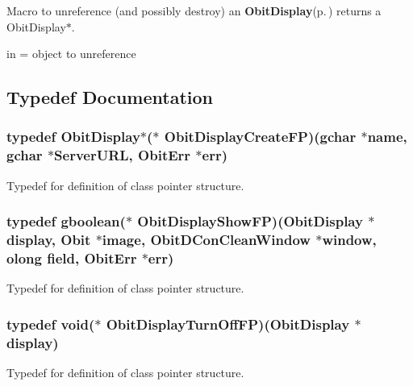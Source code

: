 Macro to unreference (and possibly destroy) an {\bf Obit\-Display}{\rm (p.\,\pageref{structObitDisplay})} returns a Obit\-Display$\ast$. 

in = object to unreference 

\subsection{Typedef Documentation}
\subsubsection{\setlength{\rightskip}{0pt plus 5cm}typedef {\bf Obit\-Display}$\ast$($\ast$ {\bf Obit\-Display\-Create\-FP})(gchar $\ast$name, gchar $\ast$Server\-URL, {\bf Obit\-Err} $\ast$err)}\label{ObitDisplay_8h_a3}


Typedef for definition of class pointer structure. 

\subsubsection{\setlength{\rightskip}{0pt plus 5cm}typedef gboolean($\ast$ {\bf Obit\-Display\-Show\-FP})({\bf Obit\-Display} $\ast$display, {\bf Obit} $\ast$image, {\bf Obit\-DCon\-Clean\-Window} $\ast$window, {\bf olong} field, {\bf Obit\-Err} $\ast$err)}\label{ObitDisplay_8h_a4}


Typedef for definition of class pointer structure. 

\subsubsection{\setlength{\rightskip}{0pt plus 5cm}typedef void($\ast$ {\bf Obit\-Display\-Turn\-Off\-FP})({\bf Obit\-Display} $\ast$display)}\label{ObitDisplay_8h_a6}


Typedef for definition of class pointer structure. 

